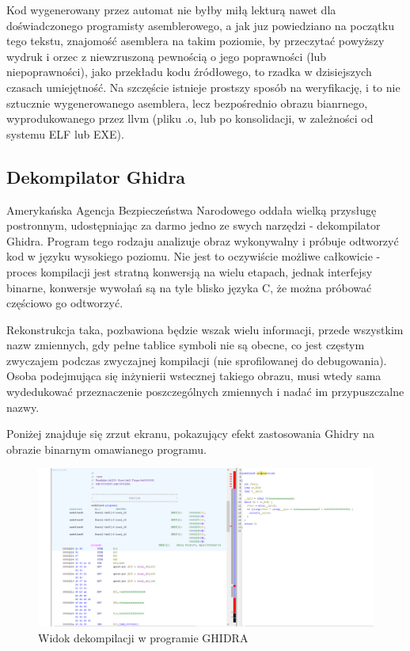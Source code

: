 Kod wygenerowany przez automat nie byłby miłą lekturą nawet dla doświadczonego programisty asemblerowego, a jak juz powiedziano na początku tego tekstu, znajomość asemblera na takim poziomie, by przeczytać powyższy wydruk i orzec z niewzruszoną pewnością o jego poprawności (lub niepoprawności), jako przekładu kodu źródłowego, to rzadka w dzisiejszych czasach umiejętność. Na szczęście istnieje prostszy sposób na weryfikację, i to nie sztucznie wygenerowanego asemblera, lecz bezpośrednio obrazu bianrnego, wyprodukowanego przez llvm (pliku .o, lub po konsolidacji, w zależności od systemu ELF lub EXE).

\subsection{Dekompilator Ghidra}
Amerykańska Agencja Bezpieczeństwa Narodowego oddała wielką przysługę postronnym, udostępniając za darmo jedno ze swych narzędzi - dekompilator Ghidra\cite{ghidra}. Program tego rodzaju analizuje obraz wykonywalny i próbuje odtworzyć kod w języku wysokiego poziomu. Nie jest to oczywiście możliwe całkowicie - proces kompilacji jest stratną konwersją na wielu etapach, jednak interfejsy binarne, konwersje wywołań są na tyle blisko języka C, że można próbować częściowo go odtworzyć. 

Rekonstrukcja taka, pozbawiona będzie wszak wielu informacji, przede wszystkim nazw zmiennych, gdy pełne tablice symboli nie są obecne, co jest częstym zwyczajem podczas zwyczajnej kompilacji (nie sprofilowanej do debugowania). Osoba podejmująca się inżynierii wstecznej takiego obrazu, musi wtedy sama wydedukować przeznaczenie poszczególnych zmiennych i nadać im przypuszczalne nazwy.

Poniżej znajduje się zrzut ekranu, pokazujący efekt zastosowania Ghidry na obrazie binarnym omawianego programu.
\begin{figure}[h]
    \centering
    \includegraphics[width=1.3\textwidth]{images/1.progmain/ghidra1.png}
    \caption{Widok dekompilacji w programie GHIDRA}
\end{figure}

